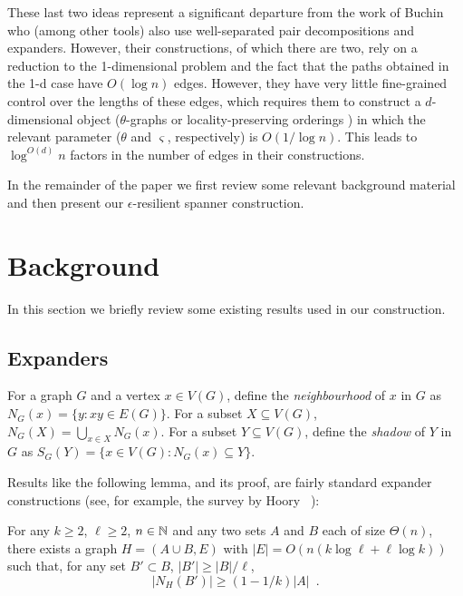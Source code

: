 \documentclass{patmorin}
\begin{document}
These last two ideas represent a significant departure from the work of
Buchin \etal\ \cite{buchin.har-peled.ea:spanner} who 
(among other tools) also use well-separated
pair decompositions and expanders.  However, their constructions, of
which there are two, rely on a reduction to the 1-dimensional problem
and the fact that the paths obtained in the 1-d case have $O(\log n)$ edges.
However, they have very little fine-grained control over the lengths of
these edges, which requires them to construct a $d$-dimensional object
($\theta$-graphs  \cite{keil.gutwin:classes} or locality-preserving orderings \cite{chan.har-peled.ea:on}) in which the relevant
parameter ($\theta$ and $\varsigma$, respectively) is $O(1/\log n)$.  This leads
to $\log^{O(d)} n$ factors in the number of edges in their constructions.

In the remainder of the paper we first review some relevant background material and then present our $\epsilon$-resilient spanner construction.

\section{Background}

In this section we briefly review some existing results used in our
construction.

\subsection{Expanders}

For a graph $G$ and a vertex $x\in V(G)$, define the \emph{neighbourhood}
of $x$ in $G$ as $N_G(x) = \{ y: xy\in E(G)\}$.  For a subset $X\subseteq
V(G)$, $N_G(X)=\bigcup_{x\in X} N_G(x)$.  For a subset $Y\subseteq
V(G)$, define the \emph{shadow} of $Y$ in $G$ as $S_G(Y) = \{x\in V(G):
N_G(x)\subseteq Y\}$.

Results like the following lemma, and its proof, are fairly standard
expander constructions (see, for example, the survey by Hoory \etal\
\cite{hoory.linial.ea:expanders}):

\begin{lem}
   For any $k\ge 2$, $\ell\ge 2$, $n\in\mathbb{N}$ and any two sets $A$ and $B$
   each of size $\Theta(n)$, there exists a graph $H=(A\cup B,E)$
   with $|E|=O(n(k\log \ell + \ell\log k))$ such that, for any set $B'\subset B$, $|B'|\ge |B|/\ell$, \[ |N_H(B')| \ge (1-1/k)|A| \enspace . \]
\end{lem}
\end{document}
